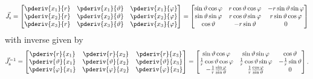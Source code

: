 \begin{equation}
	\vec{J}_{\mathrm{s}} = \begin{bmatrix}
		\pderiv{x_1}{r} & \pderiv{x_1}{\vartheta} & \pderiv{x_1}{\varphi}\\
		\pderiv{x_2}{r} & \pderiv{x_2}{\vartheta} & \pderiv{x_2}{\varphi}\\
		\pderiv{x_3}{r} & \pderiv{x_3}{\vartheta} & \pderiv{x_3}{\varphi}
	\end{bmatrix} = \begin{bmatrix}
		\sin\vartheta\cos\varphi & r\cos\vartheta\cos\varphi & -r\sin\vartheta\sin\varphi\\
		\sin\vartheta\sin\varphi & r\cos\vartheta\sin\varphi & r\sin\vartheta\cos\varphi\\
		\cos\vartheta & -r\sin\vartheta & 0
	\end{bmatrix}
\end{equation}
with inverse given by
\begin{equation}
	\vec{J}_{\mathrm{s}}^{-1} = \begin{bmatrix}
		\pderiv{r}{x_1} & \pderiv{r}{x_2} & \pderiv{r}{x_3}\\
		\pderiv{\vartheta}{x_1} & \pderiv{\vartheta}{x_2} & \pderiv{\vartheta}{x_3}\\
		\pderiv{\varphi}{x_1} & \pderiv{\varphi}{x_2} & \pderiv{\varphi}{x_3}
	\end{bmatrix} = \begin{bmatrix}
		\sin\vartheta\cos\varphi & \sin\vartheta\sin\varphi & \cos\vartheta\\
		\frac{1}{r}\cos\vartheta\cos\varphi & \frac{1}{r}\cos\vartheta\sin\varphi & -\frac{1}{r}\sin\vartheta\\
		-\frac{1}{r}\frac{\sin\varphi}{\sin\vartheta} & \frac{1}{r}\frac{\cos\varphi}{\sin\vartheta} & 0
	\end{bmatrix}.
\end{equation}
